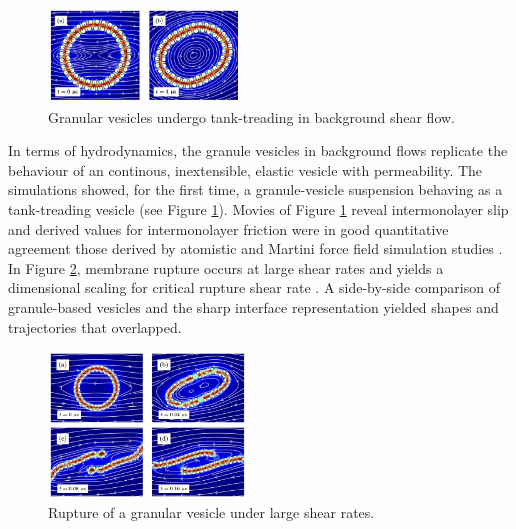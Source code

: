\begin{figure}
\vspace{-10pt}
\includegraphics[width=0.46\textwidth]{figures/PreliminaryWork/TankTreading.jpg}
\vspace{-20pt}
\caption{\label{fig:JPv_linearshear} \footnotesize Granular vesicles
  undergo tank-treading in background shear flow.}
\end{figure}
%
In terms of hydrodynamics, the granule vesicles in background flows
replicate the behaviour of an continous, inextensible, elastic vesicle
with permeability. The simulations showed, for the first time, a
granule-vesicle suspension behaving as a tank-treading vesicle
\cite{Finken2008, Shaqfeh11} (see Figure \ref{fig:JPv_linearshear}).
Movies of Figure \ref{fig:JPv_linearshear} reveal intermonolayer slip
and derived values for intermonolayer friction were in good quantitative
agreement those derived by atomistic and Martini force field simulation
studies \cite{WuoEd06, denOtter2007, SHKULIPA2005823, Zgorski2019}. In
Figure \ref{fig:JPv_rupture}, membrane rupture occurs at large shear
rates and yields a dimensional scaling for critical rupture shear rate
\cite{VLAHOVSKA2009775,keller_skalak_1982}. A side-by-side comparison of
granule-based vesicles and the sharp interface representation yielded
shapes and trajectories that overlapped.

\begin{figure}
\includegraphics[width=0.475\textwidth]{figures/PreliminaryWork/Rupture.jpg}
\caption{\label{fig:JPv_rupture} \footnotesize Rupture of a granular
  vesicle under large shear rates.}
\end{figure}

